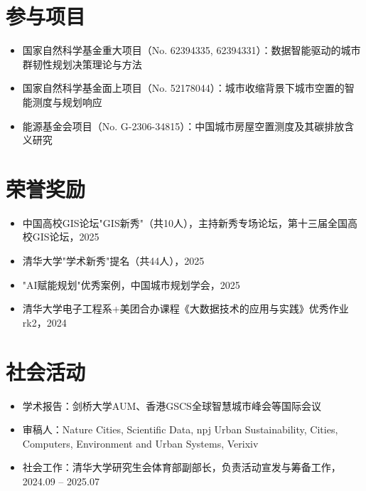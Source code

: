 \documentclass[10pt,a4paper]{article}
\begin{document}
\section{参与项目}

\begin{itemize}[leftmargin=1.2em, itemsep=3pt, parsep=1pt, topsep=2pt]
  \item 国家自然科学基金重大项目（No. 62394335, 62394331）：数据智能驱动的城市群韧性规划决策理论与方法
  \item 国家自然科学基金面上项目（No. 52178044）：城市收缩背景下城市空置的智能测度与规划响应
  \item 能源基金会项目（No. G-2306-34815）：中国城市房屋空置测度及其碳排放含义研究
\end{itemize}

\section{荣誉奖励}

\begin{itemize}[leftmargin=1.2em, itemsep=3pt, parsep=1pt, topsep=2pt]
  \item 中国高校GIS论坛"GIS新秀"（共10人），主持新秀专场论坛，第十三届全国高校GIS论坛，2025
  \item 清华大学"学术新秀"提名（共44人），2025
  \item "AI赋能规划"优秀案例，中国城市规划学会，2025
  \item 清华大学电子工程系+美团合办课程《大数据技术的应用与实践》优秀作业rk2，2024
\end{itemize}

\section{社会活动}

\begin{itemize}[leftmargin=1.2em, itemsep=3pt, parsep=1pt, topsep=2pt]
  \item 学术报告：剑桥大学AUM、香港GSCS全球智慧城市峰会等国际会议
  \item 审稿人：Nature Cities, Scientific Data, npj Urban Sustainability, Cities, Computers, Environment and Urban Systems, Verixiv
  \item 社会工作：清华大学研究生会体育部副部长，负责活动宣发与筹备工作，2024.09 -- 2025.07
\end{itemize}
\end{document}
